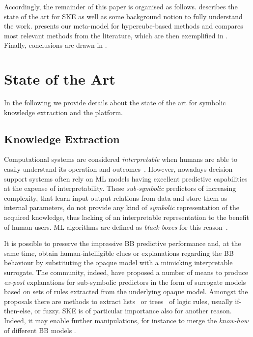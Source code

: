 \documentclass[
]{ceurart}
\begin{document}
Accordingly, the remainder of this paper is organised as follows.
%
 describes the state of the art for SKE as well as some background notion to fully understand the work.
%
 presents our meta-model for hypercube-based methods and compares most relevant methods from the literature, which are then exemplified in .
%
Finally, conclusions are drawn in .

\section{State of the Art}\label{sec:state}

In the following we provide details about the state of the art for symbolic knowledge extraction and the \psyke{} platform.

\subsection{Knowledge Extraction}\label{ssec:extraction}

Computational systems are considered \emph{interpretable} when humans are able to easily understand its operation and outcomes~\cite{agentbasedxai-aamas2020}.
%
However, nowadays decision support systems often rely on ML models having excellent predictive capabilities at the expense of interpretability.
%
These \emph{sub-symbolic} predictors of increasing complexity, that learn input-output relations from data and store them as internal parameters, do not provide any kind of \emph{symbolic} representation of the acquired knowledge, thus lacking of an interpretable representation to the benefit of human users.
%
ML algorithms are defined as \emph{black boxes} for this reason~\cite{Lipton2018}.

It is possible to preserve the impressive BB predictive performance and, at the same time, obtain human-intelligible clues or explanations regarding the BB behaviour by substituting the opaque model with a mimicking interpretable surrogate.
%
The \xai{} community, indeed, have proposed a number of means to produce \emph{ex-post} explanations for sub-symbolic predictors in the form of surrogate models based on sets of rules extracted from the underlying opaque model.
%
Amongst the proposals there are methods to extract lists~\cite{craven1994using,huysmans2006iter,gridex-extraamas2021} or trees~\cite{craven1996extracting,breiman1984classification} of logic rules, usually if-then-else, \mofn{} or fuzzy.
%
SKE is of particular importance also for another reason.
%
Indeed, it may enable further manipulations, for instance to merge the \emph{know-how} of different BB models \cite{xmas-aiiot2019}.
\end{document}
